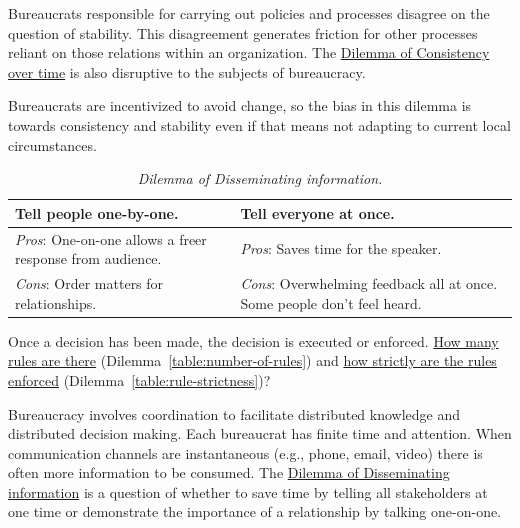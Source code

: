 Bureaucrats responsible for carrying out policies and processes disagree on the question of stability. This disagreement generates friction for other processes reliant on those relations within an organization.
The \hyperref[table:consistency]{Dilemma of Consistency over time} is also disruptive to the subjects of bureaucracy. 

Bureaucrats are incentivized to avoid change, so the bias in this dilemma is towards consistency and stability even if that means not adapting to current local circumstances. 

\begin{center}
\begin{table}[H] %
\begin{tabular}{ | m{\dilemmatablewidth}| m{\dilemmatablewidth} | } 
  \hline
  \textbf{Tell people one-by-one.} & 
  \textbf{Tell everyone at once.} \\ 
  \hline
  \textit{Pros}: One-on-one allows a freer response from audience. &
  \textit{Pros}: Saves time for the speaker. \\
  \hline
  \textit{Cons}: Order matters for relationships. & 
  \textit{Cons}: Overwhelming feedback all at once. Some people don't feel heard. \\  
  \hline
\end{tabular}
\caption{
\textit{Dilemma of Disseminating information.}
}
\label{table:disseminate-one-by-one}
\end{table}
\end{center}

Once a decision has been made, the decision is executed or enforced. \hyperref[table:number-of-rules]{How many rules are there} (Dilemma~\ref{table:number-of-rules}) and
\hyperref[table:rule-strictness]{how strictly are the rules enforced} (Dilemma~\ref{table:rule-strictness})?

Bureaucracy involves coordination to facilitate distributed knowledge and distributed decision making. Each bureaucrat has finite time and attention. When communication channels are instantaneous (e.g., phone, email, video) there is often more information to be consumed.
The \hyperref[table:disseminate-one-by-one]{Dilemma of Disseminating information} is a question of whether to save time by telling all stakeholders at one time or demonstrate the importance of a relationship by talking one-on-one. 

